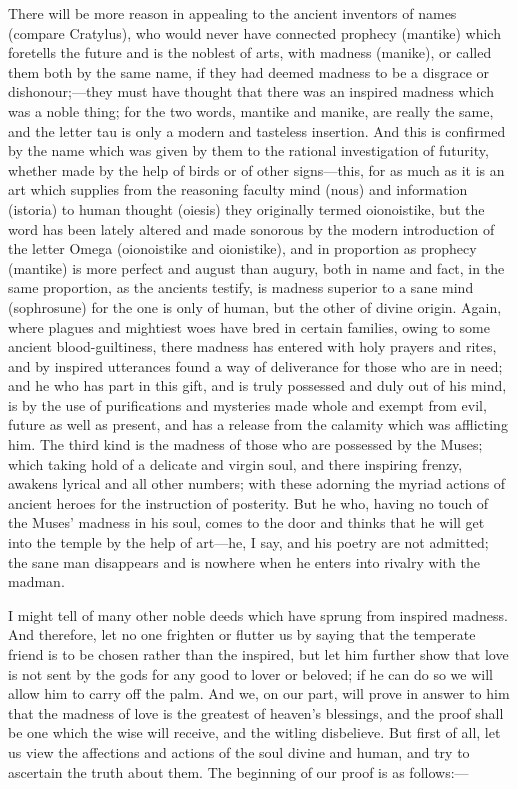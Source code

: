 \documentclass[11pt,letter]{article}
\begin{document}
\par  There will be more reason in appealing to the ancient inventors of names (compare Cratylus), who would never have connected prophecy (mantike) which foretells the future and is the noblest of arts, with madness (manike), or called them both by the same name, if they had deemed madness to be a disgrace or dishonour;—they must have thought that there was an inspired madness which was a noble thing; for the two words, mantike and manike, are really the same, and the letter tau is only a modern and tasteless insertion. And this is confirmed by the name which was given by them to the rational investigation of futurity, whether made by the help of birds or of other signs—this, for as much as it is an art which supplies from the reasoning faculty mind (nous) and information (istoria) to human thought (oiesis) they originally termed oionoistike, but the word has been lately altered and made sonorous by the modern introduction of the letter Omega (oionoistike and oionistike), and in proportion as prophecy (mantike) is more perfect and august than augury, both in name and fact, in the same proportion, as the ancients testify, is madness superior to a sane mind (sophrosune) for the one is only of human, but the other of divine origin. Again, where plagues and mightiest woes have bred in certain families, owing to some ancient blood-guiltiness, there madness has entered with holy prayers and rites, and by inspired utterances found a way of deliverance for those who are in need; and he who has part in this gift, and is truly possessed and duly out of his mind, is by the use of purifications and mysteries made whole and exempt from evil, future as well as present, and has a release from the calamity which was afflicting him. The third kind is the madness of those who are possessed by the Muses; which taking hold of a delicate and virgin soul, and there inspiring frenzy, awakens lyrical and all other numbers; with these adorning the myriad actions of ancient heroes for the instruction of posterity. But he who, having no touch of the Muses' madness in his soul, comes to the door and thinks that he will get into the temple by the help of art—he, I say, and his poetry are not admitted; the sane man disappears and is nowhere when he enters into rivalry with the madman.

\par  I might tell of many other noble deeds which have sprung from inspired madness. And therefore, let no one frighten or flutter us by saying that the temperate friend is to be chosen rather than the inspired, but let him further show that love is not sent by the gods for any good to lover or beloved; if he can do so we will allow him to carry off the palm. And we, on our part, will prove in answer to him that the madness of love is the greatest of heaven's blessings, and the proof shall be one which the wise will receive, and the witling disbelieve. But first of all, let us view the affections and actions of the soul divine and human, and try to ascertain the truth about them. The beginning of our proof is as follows:—
\end{document}
